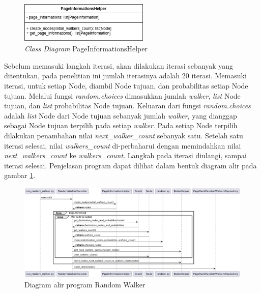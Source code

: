 \begin{figure}[H]
	\centering
	\includegraphics[keepaspectratio, width={0.55\textwidth}]{gambar/page_informations_helper_class_diagram}
	\caption{\textit{Class Diagram} PageInformationsHelper}
\end{figure}

Sebelum memasuki langkah iterasi, akan dilakukan iterasi sebanyak yang ditentukan, pada penelitian ini jumlah iterasinya adalah 20 iterasi. Memasuki iterasi, untuk setiap Node, diambil Node tujuan, dan probabilitas setiap Node tujuan. Melalui fungsi \textit{random.choices} dimasukkan jumlah \textit{walker}, \textit{list} Node tujuan, dan \textit{list} probabilitas Node tujuan. Keluaran dari fungsi \textit{random.choices} adalah \textit{list} Node dari Node tujuan sebanyak jumlah \textit{walker}, yang dianggap sebagai Node tujuan terpilih pada setiap \textit{walker}. Pada setiap Node terpilih dilakukan penambahan nilai \textit{next\_walker\_count} sebanyak satu. Setelah satu iterasi selesai, nilai \textit{walkers\_count} di-perbaharui dengan memindahkan nilai \textit{next\_walkers\_count} ke \textit{walkers\_count}. Langkah pada iterasi diulangi, sampai iterasi selesai. Penjelasan program dapat dilihat dalam bentuk diagram alir pada gambar \ref{gambar:random_walker_sequence_diagram}.

\begin{figure}[H]
	\centering
	\includegraphics[width={\textheight}, height={\textwidth}, angle=270]{gambar/run_random_walker_sequence_diagram}
	\caption{Diagram alir program Random Walker}
	\label{gambar:random_walker_sequence_diagram}
\end{figure}

